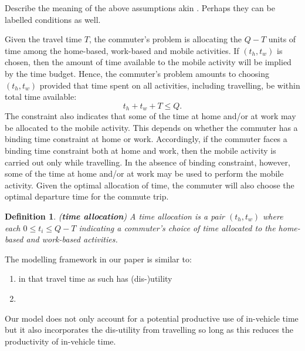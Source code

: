 \documentclass[12pt,a4paper,british]{article}
\newtheorem{definition}{Definition}[section]
\begin{document}
Describe the meaning of the above assumptions akin \citet{FosgerauSmall2017EndogenousSchedulingPreferences}. Perhaps they can be labelled conditions as well.

Given the travel time $T$, the commuter's problem is allocating the $Q-T$ units of time among the home-based, work-based and mobile activities. If $\left(t_{h},t_{w}\right)$ is chosen, then the amount of time available to the mobile activity will be implied by the time budget. Hence, the commuter's problem amounts to choosing $\left(t_{h},t_{w}\right)$ provided that time spent on all activities, including travelling, be within total time available:
\begin{equation}
t_{h}+t_{w}+T\leq Q.
\label{constraint0}
\end{equation}
The constraint also indicates that some of the time at home and/or at work may be allocated to the mobile activity. This depends on whether the commuter has a binding time constraint at home or work. Accordingly, if the commuter faces a binding time constraint both at home and work, then the mobile activity is carried out only while travelling. In the absence of binding constraint, however, some of the time at home and/or at work may be used to perform the mobile activity. Given the optimal allocation of time, the commuter will also choose the optimal departure time for the commute trip.


\begin{definition}
(\textbf{time allocation}) A time allocation is a pair $\left(t_{h},t_{w}\right)$ where each $0\leq t_{i}\leq Q-T$ indicating a commuter's choice of time allocated to the home-based and work-based activities.
\end{definition}

The modelling framework in our paper is similar to:
\begin{enumerate}
    \item \citeauthor{Oort1969EvaluationTravellingTime} in that travel time as such has (dis-)utility
    \item \citet{DeSerpa1971TheoryEconomicsTime}
\end{enumerate}

Our model does not only account for a potential productive use of in-vehicle time but it also incorporates the dis-utility from travelling so long as this reduces the productivity of in-vehicle time.
\end{document}
